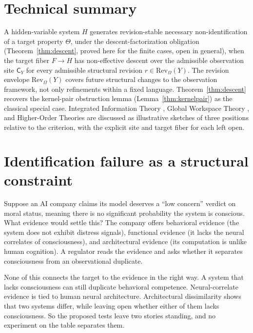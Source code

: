 \documentclass[11pt]{article}
\begin{document}
\section*{Technical summary}
A hidden-variable system $H$ generates revision-stable necessary
non-identification of a target property $\Theta$, under the descent-factorization
obligation (Theorem~\ref{thm:descent}, proved here for the finite cases, open in
general), when the target fiber $F \to H$ has non-effective descent over the
admissible observation site $\mathsf{C}_Y$ for every admissible structural
revision $r \in \mathrm{Rev}_\Omega(Y)$.
The revision envelope $\mathrm{Rev}_\Omega(Y)$ covers future structural changes
to the observation framework, not only refinements within a fixed language.
Theorem~\ref{thm:descent} recovers the kernel-pair obstruction lemma
(Lemma~\ref{thm:kernelpair}) as the classical special case.
Integrated Information Theory \citep{tononi2016}, Global Workspace Theory
\citep{baars1988,dehaene2011}, and Higher-Order Theories
\citep{rosenthal2005} are discussed as illustrative sketches of three positions
relative to the criterion, with the explicit site and target fiber for each
left open.

\tableofcontents
\newpage

\section{Identification failure as a structural constraint}
\label{sec:intro}

Suppose an AI company claims its model deserves a ``low concern'' verdict on
moral status, meaning there is no significant probability the system is
conscious. What evidence would settle this? The company offers behavioral
evidence (the system does not exhibit distress signals), functional evidence
(it lacks the neural correlates of consciousness), and architectural evidence
(its computation is unlike human cognition). A regulator reads the evidence and
asks whether it separates consciousness from an observational duplicate.

None of this connects the target to the evidence in the right way. A system
that lacks consciousness can still duplicate behavioral competence.
Neural-correlate evidence is tied to human neural architecture. Architectural
dissimilarity shows that two systems differ, while leaving open whether either
of them lacks consciousness. So the proposed tests leave two stories standing,
and no experiment on the table separates them.
\end{document}
